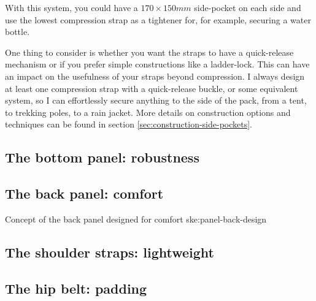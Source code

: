 \begin{note}
   With this system, you could have a $170 \times 150mm$ side-pocket on each side and use the lowest compression strap as a tightener for, for example, securing a water bottle.
\end{note}

One thing to consider is whether you want the straps to have a quick-release mechanism or if you prefer simple constructions like a ladder-lock. This can have an impact on the usefulness of your straps beyond compression. I always design at least one compression strap with a quick-release buckle, or some equivalent system, so I can effortlessly secure anything to the side of the pack, from a tent, to trekking poles, to a rain jacket. More details on construction options and techniques can be found in section \ref{sec:construction-side-pockets}.

\subsection{The bottom panel: robustness}
\subsection{The back panel: comfort}

{Concept of the back panel designed for comfort}
{ske:panel-back-design}

\subsection{The shoulder straps: lightweight}
\subsection{The hip belt: padding}
